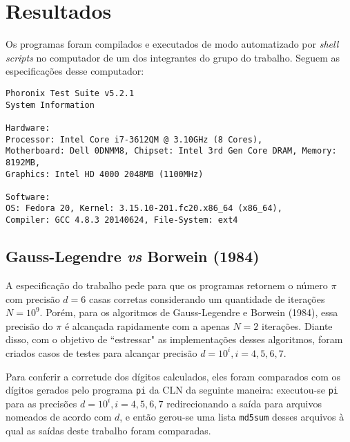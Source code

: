 \section{Resultados}

Os programas foram compilados e executados de modo automatizado por \emph{shell scripts} no computador de um dos integrantes do grupo do trabalho. Seguem as especificações desse computador:

\begin{verbatim}Phoronix Test Suite v5.2.1
System Information

Hardware:
Processor: Intel Core i7-3612QM @ 3.10GHz (8 Cores),
Motherboard: Dell 0DNMM8, Chipset: Intel 3rd Gen Core DRAM, Memory: 8192MB,
Graphics: Intel HD 4000 2048MB (1100MHz)

Software:
OS: Fedora 20, Kernel: 3.15.10-201.fc20.x86_64 (x86_64),
Compiler: GCC 4.8.3 20140624, File-System: ext4
\end{verbatim}

\subsection{Gauss-Legendre \emph{vs} Borwein (1984)}

A especificação do trabalho pede para que os programas retornem o número $\pi$ com precisão $d = 6$ casas corretas considerando um quantidade de iterações $N = 10^9$. Porém, para os algoritmos de Gauss-Legendre e Borwein (1984), essa precisão do $\pi$ é alcançada rapidamente com a apenas $N = 2$ iterações. Diante disso, com o objetivo de ``estressar" as implementações desses algoritmos, foram criados casos de testes para alcançar precisão $d = 10^i, i = 4, 5, 6, 7$.

Para conferir a corretude dos dígitos calculados, eles foram comparados com os dígitos gerados pelo programa \texttt{pi} da CLN\cite{programa-pi} da seguinte maneira: executou-se \texttt{pi} para as precisões $d = 10^i, i = 4, 5, 6, 7$ redirecionando a saída para arquivos nomeados de acordo com $d$, e então gerou-se uma lista \texttt{md5sum} desses arquivos à qual as saídas deste trabalho foram comparadas.

